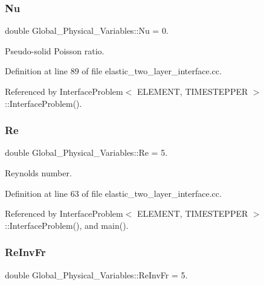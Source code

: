 \subsubsection{\texorpdfstring{Nu}{Nu}}
{\footnotesize\ttfamily double Global\+\_\+\+Physical\+\_\+\+Variables\+::\+Nu = 0.}



Pseudo-\/solid Poisson ratio. 



Definition at line 89 of file elastic\+\_\+two\+\_\+layer\+\_\+interface.\+cc.



Referenced by Interface\+Problem$<$ E\+L\+E\+M\+E\+N\+T, T\+I\+M\+E\+S\+T\+E\+P\+P\+E\+R $>$\+::\+Interface\+Problem().

\mbox{\label{namespaceGlobal__Physical__Variables_ab814e627d2eb5bc50318879d19ab16b9}} 
\subsubsection{\texorpdfstring{Re}{Re}}
{\footnotesize\ttfamily double Global\+\_\+\+Physical\+\_\+\+Variables\+::\+Re = 5.}



Reynolds number. 



Definition at line 63 of file elastic\+\_\+two\+\_\+layer\+\_\+interface.\+cc.



Referenced by Interface\+Problem$<$ E\+L\+E\+M\+E\+N\+T, T\+I\+M\+E\+S\+T\+E\+P\+P\+E\+R $>$\+::\+Interface\+Problem(), and main().

\mbox{\label{namespaceGlobal__Physical__Variables_aa6286f02b476912dd7550eced538331a}} 
\subsubsection{\texorpdfstring{Re\+Inv\+Fr}{ReInvFr}}
{\footnotesize\ttfamily double Global\+\_\+\+Physical\+\_\+\+Variables\+::\+Re\+Inv\+Fr = 5.}



